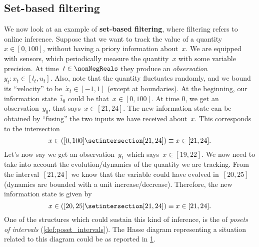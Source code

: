 \subsection{Set-based filtering}
\begin{example}
    We now look at an example of \textbf{set-based filtering}, where filtering refers to online inference.
    Suppose that we want to track the value of a quantity~$x\in [0,100]$, without having a priory information about~$x$.
    We are equipped with sensors, which periodically measure the quantity~$x$ with some variable precision.
    At time~$t\in \nonNegReals $ they produce an \emph{observation}~$y_t\colon x_t\in [l_t,u_t]$.
    Also, note that the quantity fluctuates randomly, and we bound its ``velocity'' to be~$\dot{x}_t\in [-1,1]$ (except at boundaries).
    At the beginning, our information state~$\bar{i}_0$ could be that~$x\in [0,100]$.
    At time 0, we get an observation~$y_0$, that says~$x\in [21,24]$.
    The new information state can be obtained by ``fusing'' the two inputs we have received about~$x$.
    This corresponds to the intersection
    \begin{equation*}
        x\in \left( [0,100] \setintersection [21,24]\right)\equiv x\in [21,24].
    \end{equation*}
    Let's now say we get an observation~$y_1$ which says~$x\in [19,22]$.
    We now need to take into account the evolution/dynamics of the quantity we are tracking.
    From the interval~$[21,24]$ we know that the variable could have evolved in~$[20,25]$ (dynamics are bounded with a unit increase/decrease).
    Therefore, the new information state is given by
    \begin{equation*}
        x\in \left( [20,25] \setintersection [21,24]\right)\equiv x\in [21,24].
    \end{equation*}
    One of the structures which could sustain this kind of inference, is the of \emph{posets of intervals} (\cref{def:poset_intervals}).
    The Hasse diagram representing a situation related to this diagram could be as reported in \cref{fig:hasse_filtering}.
    \begin{figure}[h!]
        \centering
        \caption{}
        \label{fig:hasse_filtering}
    \end{figure}
\end{example}